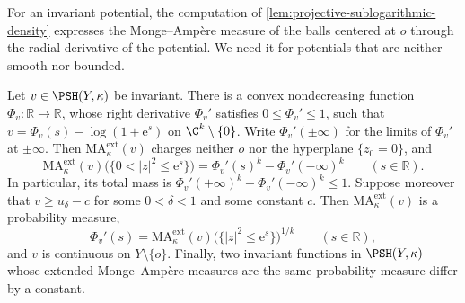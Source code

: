 For an invariant potential, the computation of \cref{lem:projective-sublogarithmic-density} expresses the Monge--Amp\`ere measure of the balls centered at $o$ through the radial derivative of the potential. We need it for potentials that are neither smooth nor bounded.

\begin{lemma}\label{lem:nonlp-selection-radial}
Let $v\in\PSH(Y,\kappa)$ be invariant. There is a convex nondecreasing function $\Phi_v\colon\mathbb R\to\mathbb R$, whose right derivative $\Phi_v'$ satisfies $0\leq\Phi_v'\leq1$, such that $v=\Phi_v(s)-\log(1+\mathrm{e}^s)$ on $\C^k\setminus\{0\}$. Write $\Phi_v'(\pm\infty)$ for the limits of $\Phi_v'$ at $\pm\infty$. Then $\mathrm{MA}^{\mathrm{ext}}_\kappa(v)$ charges neither $o$ nor the hyperplane $\{z_0=0\}$, and
\begin{equation}\label{eq:nonlp-selection-flux}
 \mathrm{MA}^{\mathrm{ext}}_\kappa(v)\bigl(\{0<|z|^2\leq\mathrm{e}^s\}\bigr)
 =\Phi_v'(s)^k-\Phi_v'(-\infty)^k\qquad(s\in\mathbb R).
\end{equation}
In particular, its total mass is $\Phi_v'(+\infty)^k-\Phi_v'(-\infty)^k\leq1$. Suppose moreover that $v\geq u_\delta-c$ for some $0<\delta<1$ and some constant $c$. Then $\mathrm{MA}^{\mathrm{ext}}_\kappa(v)$ is a probability measure,
\[
 \Phi_v'(s)=\mathrm{MA}^{\mathrm{ext}}_\kappa(v)\bigl(\{|z|^2\leq\mathrm{e}^s\}\bigr)^{1/k}\qquad(s\in\mathbb R),
\]
and $v$ is continuous on $Y\setminus\{o\}$. Finally, two invariant functions in $\PSH(Y,\kappa)$ whose extended Monge--Amp\`ere measures are the same probability measure differ by a constant.
\end{lemma}
